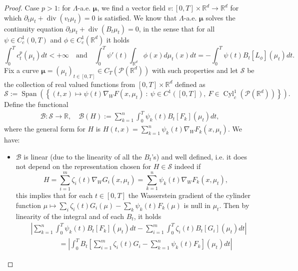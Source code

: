 \documentclass[10pt,leqno]{amsart}
\numberwithin{equation}{section}
\newcommand{\R}{\mathbb{R}}
\newcommand{\PP}{\mathcal{P}}
\begin{document}
\begin{proof}
    Case $p>1$: for $\Lambda$-a.e. $\boldsymbol{\mu}$, we find a vector field $v:[0,T]\times \R^d \to \R^d$ for which $\partial_t\mu_t + \operatorname{div}(v_t\mu_t)=0$ is satisfied. 
    We know that $\Lambda$-a.e. $\boldsymbol{\mu}$ solves the continuity equation $\partial_t\mu_t +\operatorname{div}(B_t\mu_t) =0 $, in the sense that for all $\psi\in C_c^1(0,T)$ and $\phi \in C^1_c(\R^d)$ it holds
    \begin{equation}
        \int_0^T c_t^p(\mu_t) dt <+\infty \quad \text{and} \quad
        \int_0^T \psi'(t) \int_{\R^d} \phi(x) d\mu_t(x) dt = - \int_0^T \psi(t) B_t[L_\phi](\mu_t) dt.
    \end{equation}
    Fix a curve $\boldsymbol{\mu}= (\mu_t)_{t\in [0,T]} \in C_T(\PP(\R^d))$ with such properties and let $\mathcal{S}$ be the collection of real valued functions from $[0,T]\times \R^d$ defined as
    \[\mathcal{S}:= \operatorname{Span}\left( \left\{ (t,x) \mapsto \psi(t)\nabla_W F(x,\mu_t) \ : \ \psi\in C^1([0,T]), \ F\in \operatorname{Cyl}_c^1(\PP(\R^d)) \right\}\right).\]
    Define the functional 
    \begin{equation}
        \begin{aligned}
            \mathcal{B} :\mathcal{S}  \to \R, \quad
            \mathcal{B}(H) :=  \sum_{k=1}^n \int_0^T \psi_k(t)B_t[F_k](\mu_t) dt,
        \end{aligned}
    \end{equation} 
    where the general form for $H$ is $H (t,x) = \sum_{k=1}^n \psi_k(t) \nabla_WF_k(x,\mu_t)$.
    We have:
    \begin{itemize}
        \item $\mathcal{B}$ is linear (due to the linearity of all the $B_t$'s) and well defined, i.e. it does not depend on the representation chosen for $H\in \mathcal{S}$ indeed if \[H = \sum_{i=1}^m \zeta_i(t) \nabla_W G_i(x,\mu_t) = \sum_{k=1}^n \psi_k(t) \nabla_WF_k(x,\mu_t), \]
        this implies that for each $t\in [0,T]$ the Wasserstein gradient of the cylinder function $\mu \mapsto \sum_i \zeta_i(t) G_i(\mu) - \sum_k \psi_k(t)F_k(\mu)$ is null in $\mu_t$. Then by linearity of the integral and of each $B_t$, it holds
        \begin{align*}
             & \left| \sum_{k=1}^n \int_0^T \psi_k(t)B_t[F_k](\mu_t) dt - \sum_{i=1}^m \int_0^T \zeta_i(t)B_t[G_i](\mu_t) dt \right| \\
            & \quad \quad \quad \quad = \left| \int_0^T B_t\left[\sum_{i=1}^m \zeta_i(t) G_i - \sum_{k=1}^n \psi_k(t)F_k \right](\mu_t)dt \right| 

\end{align*}
\end{itemize}
\end{proof}
\end{document}
